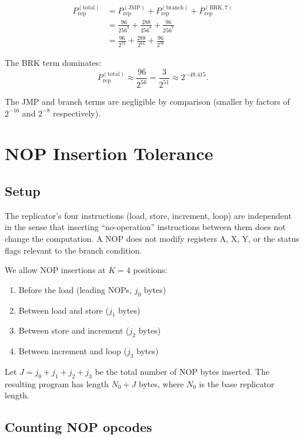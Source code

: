 \documentclass{article}
\newcommand{\Prep}{P_{\mathrm{rep}}}
\begin{document}
\begin{align}
  \Prep^{(\mathrm{total})} &= \Prep^{(\mathrm{JMP})} + \Prep^{(\mathrm{branch})} + \Prep^{(\mathrm{BRK,7})} \nonumber \\
  &= \frac{96}{256^9} + \frac{288}{256^8} + \frac{96}{256^7} \nonumber \\
  &= \frac{96}{2^{72}} + \frac{288}{2^{64}} + \frac{96}{2^{56}} \label{eq:total}
\end{align}

The BRK term dominates:
\[
  \Prep^{(\mathrm{total})} \approx \frac{96}{2^{56}} = \frac{3}{2^{51}} \approx 2^{-49.415}.
\]

The JMP and branch terms are negligible by comparison (smaller by
factors of $2^{-16}$ and $2^{-8}$ respectively).

\section{NOP Insertion Tolerance}
\label{sec:nop}

\subsection{Setup}

The replicator's four instructions (load, store, increment, loop) are
independent in the sense that inserting ``no-operation'' instructions
between them does not change the computation. A NOP does not modify
registers A, X, Y, or the status flags relevant to the branch condition.

We allow NOP insertions at $K = 4$ positions:
\begin{enumerate}
\item Before the load (leading NOPs, $j_0$ bytes)
\item Between load and store ($j_1$ bytes)
\item Between store and increment ($j_2$ bytes)
\item Between increment and loop ($j_3$ bytes)
\end{enumerate}

Let $J = j_0 + j_1 + j_2 + j_3$ be the total number of NOP bytes
inserted. The resulting program has length $N_0 + J$ bytes, where
$N_0$ is the base replicator length.

\subsection{Counting NOP opcodes}
\end{document}
